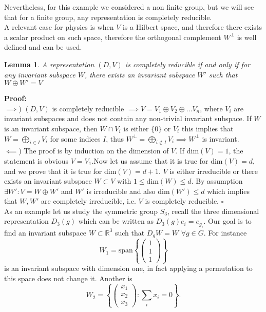 \documentclass[12pt]{book}
\theoremstyle{plain}
\newcommand{\R}{\mathbb{R}}
\newcommand{\x}{\mathbf{x}}
\newtheorem{lem}[thm]{Lemma}
\theoremstyle{definition}
\theoremstyle{remark}
\begin{document}
Nevertheless, for this example we considered a non finite group, but we will see that for a finite group, any representation is completely reducible. \\
A relevant case for physics is when $V$ is a Hilbert space, and therefore there exists a scalar product on such space, therefore the orthogonal complement $W^\perp$ is well defined and can be used.
\begin{lem}\label{lemmautile}
A representation $(D,V)$ is completely reducible if and only if for any invariant subspace $W$, there exists an invariant subspace $W'$ such that $W\oplus W' = V$
\end{lem}
\hspace{-1.4em}\textbf{Proof:}\\
$\implies$) $(D,V)$ is completely reducible $\implies V= V_1\oplus V_2\oplus \dots V_n$, where $V_i$ are invariant subspaces and does not contain any non-trivial invariant subspace. If $W$ is an invariant subspace, then $W\cap V_i$ is either $\{0\}$ or $V_i$ this implies that $W = \bigoplus_{i\in I} V_i$ for some indices $I$, thus $W^\perp = \bigoplus_{i\notin I} V_i \implies W^\perp$ is invariant.\\
$\impliedby$) The proof is by induction on the dimension of $V$. If $\text{dim}(V) = 1$, the statement is obvious $V= V_1$.Now let us assume that it is true for $\text{dim}(V) = d$, and we prove that it is true for $\text{dim}(V) = d+1$. $V$ is either irreducible or there exists an invariant subspace $W\subset V$ with $1\leq \text{dim}(W)\leq d$. By assumption $\exists W' : V = W\oplus W'$ and $W'$ is irreducible and also $\text{dim}(W') \leq d$ which implies that $W,W'$ are completely irreducible, i.e. $V$ is completely reducible. \hfill\ensuremath{\square}\\
As an example let us study the symmetric group $S_3$, recall the three dimensional representation $D_3(g)$ which can be written as $D_3(g)e_i = e_{g_i}$. Our goal is to find an invariant subspace $W\subset \R^3$ such that $D_g W = W$ $\forall g\in G$. For instance
\[W_1 = \text{span}\left\{\begin{pmatrix}1\\1\\1\end{pmatrix}\right\}\]
is an invariant subspace with dimension one, in fact applying a permutation to this space does not change it. Another is 
\[W_2 = \left\{\begin{pmatrix}x_1\\x_2\\x_3\end{pmatrix}:\sum_i x_i = 0\right\}.\]
\end{document}
